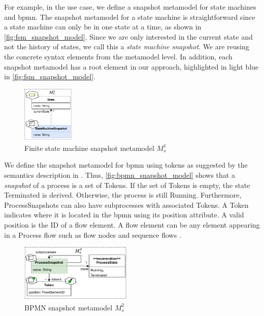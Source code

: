 \documentclass{jot}
\begin{document}
For example, in the use case, we define a snapshot metamodel for state machines and \gls*{bpmn}.
The snapshot metamodel for a state machine is straightforward since a state machine can only be in one state at a time, as shown in \autoref{fig:fsm_snapshot_model}.
Since we are only interested in the current state and not the history of states, we call this a \emph{state machine snapshot}.
We are reusing the concrete syntax elements from the metamodel level.
In addition, each snapshot metamodel has a root element in our approach, highlighted in light blue in \autoref{fig:fsm_snapshot_model}.
\begin{figure}[h]
    \centering
    \includegraphics[width=0.22\textwidth]{figures/state_machine_s_model.pdf}
    \caption{Finite state machine snapshot metamodel $M_s^1$}
    \label{fig:fsm_snapshot_model}
\end{figure}

We define the snapshot metamodel for \gls*{bpmn} using tokens as suggested by the semantics description in \cite{objectmanagementgroupBusinessProcessModel2013}.
Thus, \autoref{fig:bpmn_snapshot_model} shows that a \emph{snapshot} of a process is a set of \textsf{Token}s.
If the set of \textsf{Token}s is empty, the state \textsf{Terminated} is derived.
Otherwise, the process is still \textsf{Running}.
Furthermore, \textsf{ProcessSnapshot}s can also have \textsf{subprocesses} with associated \textsf{Token}s.
A \textsf{Token} indicates where it is located in the \gls*{bpmn} using its \textsf{position} attribute.
A valid \textsf{position} is the ID of a flow element.
A flow element can be any element appearing in a \textsf{Process} flow such as flow nodes and sequence flows \cite{objectmanagementgroupBusinessProcessModel2013}.

\begin{figure}[h]
    \centering
    \includegraphics[width=0.475\textwidth]{figures/bpmn_s_model.pdf}
    \caption{BPMN snapshot metamodel $M_s^2$}
    \label{fig:bpmn_snapshot_model}
\end{figure}
\end{document}
